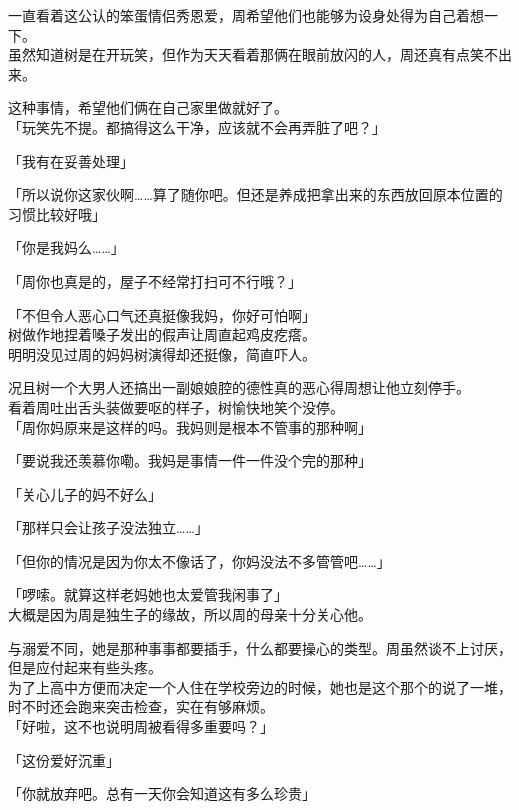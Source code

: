 一直看着这公认的笨蛋情侣秀恩爱，周希望他们也能够为设身处得为自己着想一下。\\

虽然知道树是在开玩笑，但作为天天看着那俩在眼前放闪的人，周还真有点笑不出来。

这种事情，希望他们俩在自己家里做就好了。\\

「玩笑先不提。都搞得这么干净，应该就不会再弄脏了吧？」

「我有在妥善处理」

「所以说你这家伙啊……算了随你吧。但还是养成把拿出来的东西放回原本位置的习惯比较好哦」

「你是我妈么……」

「周你也真是的，屋子不经常打扫可不行哦？」

「不但令人恶心口气还真挺像我妈，你好可怕啊」\\

树做作地捏着嗓子发出的假声让周直起鸡皮疙瘩。\\

明明没见过周的妈妈树演得却还挺像，简直吓人。

况且树一个大男人还搞出一副娘娘腔的德性真的恶心得周想让他立刻停手。\\

看着周吐出舌头装做要呕的样子，树愉快地笑个没停。\\

「周你妈原来是这样的吗。我妈则是根本不管事的那种啊」

「要说我还羡慕你嘞。我妈是事情一件一件没个完的那种」

「关心儿子的妈不好么」

「那样只会让孩子没法独立……」

「但你的情况是因为你太不像话了，你妈没法不多管管吧……」

「啰嗦。就算这样老妈她也太爱管我闲事了」\\

大概是因为周是独生子的缘故，所以周的母亲十分关心他。

与溺爱不同，她是那种事事都要插手，什么都要操心的类型。周虽然谈不上讨厌，但是应付起来有些头疼。\\

为了上高中方便而决定一个人住在学校旁边的时候，她也是这个那个的说了一堆，时不时还会跑来突击检查，实在有够麻烦。\\

「好啦，这不也说明周被看得多重要吗？」

「这份爱好沉重」

「你就放弃吧。总有一天你会知道这有多么珍贵」

